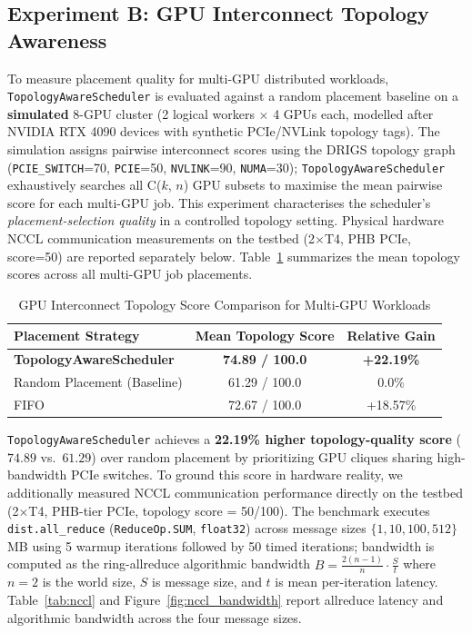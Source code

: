 \subsection{Experiment B: GPU Interconnect Topology Awareness}
To measure placement quality for multi-GPU distributed workloads, \texttt{TopologyAwareScheduler} is evaluated against a random placement baseline on a \textbf{simulated} 8-GPU cluster (2 logical workers $\times$ 4 GPUs each, modelled after NVIDIA RTX 4090 devices with synthetic PCIe/NVLink topology tags). The simulation assigns pairwise interconnect scores using the DRIGS topology graph (\texttt{PCIE\_SWITCH}=70, \texttt{PCIE}=50, \texttt{NVLINK}=90, \texttt{NUMA}=30); \texttt{TopologyAwareScheduler} exhaustively searches all C($k$, $n$) GPU subsets to maximise the mean pairwise score for each multi-GPU job. This experiment characterises the scheduler's \emph{placement-selection quality} in a controlled topology setting. Physical hardware NCCL communication measurements on the testbed (2$\times$T4, PHB PCIe, score=50) are reported separately below. Table~\ref{tab:topology} summarizes the mean topology scores across all multi-GPU job placements.

\begin{table}[htbp]
\centering
\caption{GPU Interconnect Topology Score Comparison for Multi-GPU Workloads}
\label{tab:topology}
\begin{tabular}{lcc}
\toprule
\textbf{Placement Strategy} & \textbf{Mean Topology Score} & \textbf{Relative Gain} \\
\midrule
\textbf{TopologyAwareScheduler} & \textbf{74.89 / 100.0} & \textbf{+22.19\%} \\
Random Placement (Baseline) & 61.29 / 100.0 & 0.0\% \\
FIFO & 72.67 / 100.0 & +18.57\% \\
\bottomrule
\end{tabular}
\end{table}

\texttt{TopologyAwareScheduler} achieves a \textbf{22.19\% higher topology-quality score} ($74.89$ vs.\ $61.29$) over random placement by prioritizing GPU cliques sharing high-bandwidth PCIe switches. To ground this score in hardware reality, we additionally measured NCCL communication performance directly on the testbed (2$\times$T4, PHB-tier PCIe, topology score = 50/100). The benchmark executes \texttt{dist.all\_reduce} (\texttt{ReduceOp.SUM}, \texttt{float32}) across message sizes $\{1, 10, 100, 512\}$\,MB using 5 warmup iterations followed by 50 timed iterations; bandwidth is computed as the ring-allreduce algorithmic bandwidth $B = \frac{2(n-1)}{n} \cdot \frac{S}{t}$ where $n=2$ is the world size, $S$ is message size, and $t$ is mean per-iteration latency. Table~\ref{tab:nccl} and Figure~\ref{fig:nccl_bandwidth} report allreduce latency and algorithmic bandwidth across the four message sizes.

